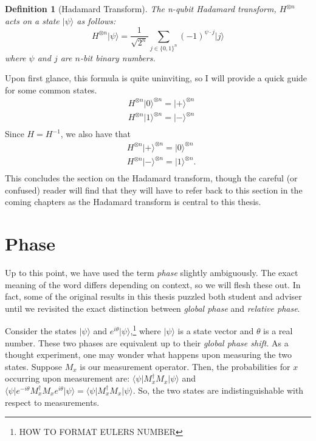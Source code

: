 \documentclass[12pt,twoside]{reedthesis}
\newtheorem{definition}{Definition}
\newcommand{\ketz}{\ensuremath{\lvert 0\rangle}\xspace}
\newcommand{\keto}{\ensuremath{\lvert 1\rangle}\xspace}
\newcommand{\ket}[1]{\ensuremath{\lvert #1\rangle}\xspace}
\newcommand{\bra}[1]{\ensuremath{\langle #1\vert}\xspace}
\newcommand{\Hplus}{\ensuremath{\lvert + \rangle}\xspace}
\newcommand{\Hminus}{\ensuremath{\lvert- \rangle}\xspace}
\begin{document}
\begin{definition}[Hadamard Transform] The n-qubit Hadamard transform, $H^{\otimes n}$ acts on a state $\ket{\psi}$ as follows:
\begin{equation*}
H^{\otimes n} \ket{\psi} = \frac{1}{\sqrt{2^n}} \sum_{j \in \{0,1\}^n} (-1)^{\psi \cdot j} \ket{j}
\end{equation*}
where $\psi$ and $j$ are $n$-bit binary numbers.
\end{definition}
Upon first glance, this formula is quite uninviting, so I will provide a quick guide for some common states. 
\begin{align*}
& H^{\otimes n} \ketz^{\otimes n} = \Hplus^{\otimes n} \\
& H^{\otimes n} \keto^{\otimes n} = \Hminus^{\otimes n} \\
\end{align*}
Since $H = H^{-1}$, we also have that
\begin{align*}
& H^{\otimes n} \Hplus^{\otimes n} =  \ketz^{\otimes n} \\
& H^{\otimes n} \Hminus^{\otimes n} = \keto^{\otimes n}. \\
\end{align*}
This concludes the section on the Hadamard transform, though the careful (or confused) reader will find that they will have to refer back to this section in the coming chapters as the Hadamard transform is central to this thesis. 

\section{Phase}
Up to this point, we have used the term \textit{phase} slightly ambiguously. The exact meaning of the word differs depending on context, so we will flesh these out. In fact, some of the original results in this thesis puzzled both student and adviser until we revisited the exact distinction between \textit{global phase} and \textit{relative phase}.

Consider the states $\ket{\psi}$ and $e^{i \theta}\ket{\psi}$,\footnote{HOW TO FORMAT EULERS NUMBER} where $\ket{\psi}$ is a state vector and $\theta$ is a real number. These two phases are equivalent up to their \textit{global phase shift}. As a thought experiment, one may wonder what happens upon measuring the two states. Suppose $M_x$ is our measurement operator. Then, the probabilities for $x$ occurring upon measurement are: $\bra{\psi}M_x^\dagger M_x \ket{\psi}$ and $\bra{\psi}e^{-i\theta}M_x^\dagger M_x e^{i\theta}\ket{\psi} = \bra{\psi}M_x^\dagger M_x \ket{\psi}.$ So, the two states are indistinguishable with respect to measurements. 
\end{document}
